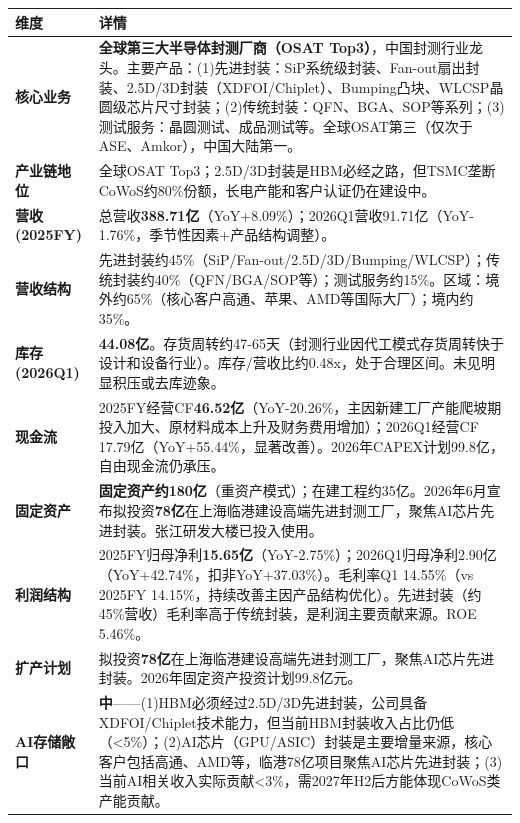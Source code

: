 \begin{exhibitbox}
\centering
\scriptsize
\renewcommand{\arraystretch}{1.20}
\begin{tabularx}{\exhibitboxwidth}{>{\bfseries}p{2.2cm} >{\raggedright\arraybackslash\sloppy\hspace{0pt}}X}
\toprule
\textbf{维度} & \textbf{详情} \\
\midrule
核心业务 & \textbf{全球第三大半导体封测厂商（OSAT Top3）}，中国封测行业龙头。主要产品：(1)先进封装：SiP系统级封装、Fan-out扇出封装、2.5D/3D封装（XDFOI/Chiplet）、Bumping凸块、WLCSP晶圆级芯片尺寸封装；(2)传统封装：QFN、BGA、SOP等系列；(3)测试服务：晶圆测试、成品测试等。全球OSAT第三（仅次于ASE、Amkor），中国大陆第一。 \\
产业链地位 & 全球OSAT Top3；2.5D/3D封装是HBM必经之路，但TSMC垄断CoWoS约80\%份额，长电产能和客户认证仍在建设中。 \\
营收(2025FY) & 总营收\textbf{388.71亿}（YoY+8.09\%）；2026Q1营收91.71亿（YoY-1.76\%，季节性因素+产品结构调整）。 \\
营收结构 & 先进封装约45\%（SiP/Fan-out/2.5D/3D/Bumping/WLCSP）；传统封装约40\%（QFN/BGA/SOP等）；测试服务约15\%。区域：境外约65\%（核心客户高通、苹果、AMD等国际大厂）；境内约35\%。 \\
库存(2026Q1) & \textbf{44.08亿}。存货周转约47-65天（封测行业因代工模式存货周转快于设计和设备行业）。库存/营收比约0.48x，处于合理区间。未见明显积压或去库迹象。 \\
现金流 & 2025FY经营CF\textbf{46.52亿}（YoY-20.26\%，主因新建工厂产能爬坡期投入加大、原材料成本上升及财务费用增加）；2026Q1经营CF 17.79亿（YoY+55.44\%，显著改善）。2026年CAPEX计划99.8亿，自由现金流仍承压。 \\
固定资产 & \textbf{固定资产约180亿}（重资产模式）；在建工程约35亿。2026年6月宣布拟投资\textbf{78亿}在上海临港建设高端先进封测工厂，聚焦AI芯片先进封装。张江研发大楼已投入使用。 \\
利润结构 & 2025FY归母净利\textbf{15.65亿}（YoY-2.75\%）；2026Q1归母净利2.90亿（YoY+42.74\%，扣非YoY+37.03\%）。毛利率Q1 14.55\%（vs 2025FY 14.15\%，持续改善主因产品结构优化）。先进封装（约45\%营收）毛利率高于传统封装，是利润主要贡献来源。ROE 5.46\%。 \\
\midrule
\rowcolor{riskamber!8}
\textbf{扩产计划} & 拟投资\textbf{78亿}在上海临港建设高端先进封测工厂，聚焦AI芯片先进封装。2026年固定资产投资计划99.8亿元。 \\
\midrule
AI存储敞口 & \textbf{中}——(1)HBM必须经过2.5D/3D先进封装，公司具备XDFOI/Chiplet技术能力，但当前HBM封装收入占比仍低（<5\%）；(2)AI芯片（GPU/ASIC）封装是主要增量来源，核心客户包括高通、AMD等，临港78亿项目聚焦AI芯片先进封装；(3)当前AI相关收入实际贡献<3\%，需2027年H2后方能体现CoWoS类产能贡献。 \\
\bottomrule
\end{tabularx}
\end{exhibitbox}

